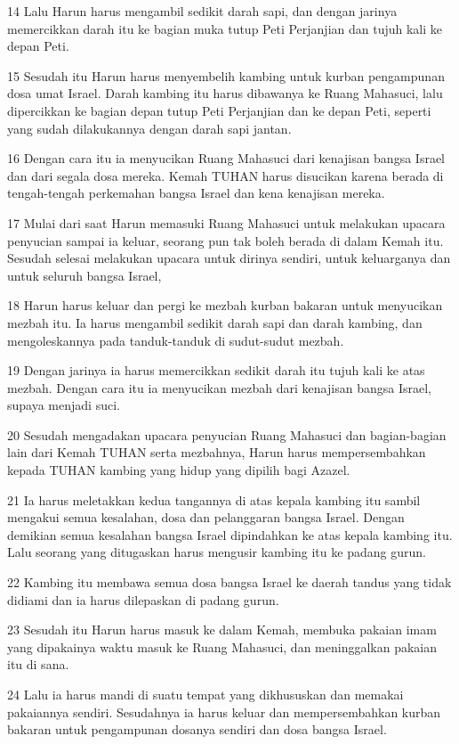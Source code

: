 \par 14 Lalu Harun harus mengambil sedikit darah sapi, dan dengan jarinya memercikkan darah itu ke bagian muka tutup Peti Perjanjian dan tujuh kali ke depan Peti.
\par 15 Sesudah itu Harun harus menyembelih kambing untuk kurban pengampunan dosa umat Israel. Darah kambing itu harus dibawanya ke Ruang Mahasuci, lalu dipercikkan ke bagian depan tutup Peti Perjanjian dan ke depan Peti, seperti yang sudah dilakukannya dengan darah sapi jantan.
\par 16 Dengan cara itu ia menyucikan Ruang Mahasuci dari kenajisan bangsa Israel dan dari segala dosa mereka. Kemah TUHAN harus disucikan karena berada di tengah-tengah perkemahan bangsa Israel dan kena kenajisan mereka.
\par 17 Mulai dari saat Harun memasuki Ruang Mahasuci untuk melakukan upacara penyucian sampai ia keluar, seorang pun tak boleh berada di dalam Kemah itu. Sesudah selesai melakukan upacara untuk dirinya sendiri, untuk keluarganya dan untuk seluruh bangsa Israel,
\par 18 Harun harus keluar dan pergi ke mezbah kurban bakaran untuk menyucikan mezbah itu. Ia harus mengambil sedikit darah sapi dan darah kambing, dan mengoleskannya pada tanduk-tanduk di sudut-sudut mezbah.
\par 19 Dengan jarinya ia harus memercikkan sedikit darah itu tujuh kali ke atas mezbah. Dengan cara itu ia menyucikan mezbah dari kenajisan bangsa Israel, supaya menjadi suci.
\par 20 Sesudah mengadakan upacara penyucian Ruang Mahasuci dan bagian-bagian lain dari Kemah TUHAN serta mezbahnya, Harun harus mempersembahkan kepada TUHAN kambing yang hidup yang dipilih bagi Azazel.
\par 21 Ia harus meletakkan kedua tangannya di atas kepala kambing itu sambil mengakui semua kesalahan, dosa dan pelanggaran bangsa Israel. Dengan demikian semua kesalahan bangsa Israel dipindahkan ke atas kepala kambing itu. Lalu seorang yang ditugaskan harus mengusir kambing itu ke padang gurun.
\par 22 Kambing itu membawa semua dosa bangsa Israel ke daerah tandus yang tidak didiami dan ia harus dilepaskan di padang gurun.
\par 23 Sesudah itu Harun harus masuk ke dalam Kemah, membuka pakaian imam yang dipakainya waktu masuk ke Ruang Mahasuci, dan meninggalkan pakaian itu di sana.
\par 24 Lalu ia harus mandi di suatu tempat yang dikhususkan dan memakai pakaiannya sendiri. Sesudahnya ia harus keluar dan mempersembahkan kurban bakaran untuk pengampunan dosanya sendiri dan dosa bangsa Israel.
